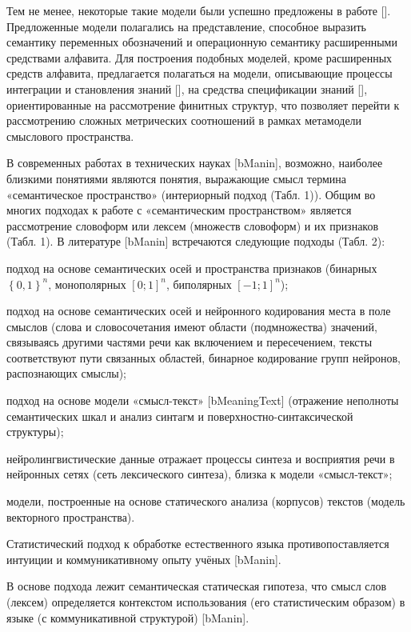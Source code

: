 Тем не менее, некоторые такие модели были успешно предложены в работе []. Предложенные модели полагались на представление, способное выразить семантику переменных обозначений и операционную семантику расширенными средствами алфавита. Для построения подобных моделей, кроме расширенных средств алфавита, предлагается полагаться на модели, описывающие процессы интеграции и становления знаний [], на средства спецификации знаний [], ориентированные на рассмотрение финитных структур, что позволяет перейти к рассмотрению сложных метрических соотношений в рамках метамодели смыслового пространства.

В современных работах в технических науках [bManin], возможно, наиболее близкими понятиями являются понятия, выражающие смысл термина «семантическое пространство» (интериорный подход (Табл. 1)).
Общим во многих подходах к работе с «семантическим пространством» является рассмотрение словоформ или лексем (множеств словоформ) и их признаков (Табл. 1). В литературе [bManin] встречаются следующие подходы (Табл. 2):
\begin{scnitemize}
	\item подход на основе семантических осей и пространства признаков (бинарных $\left\lbrace 0,1\right\rbrace ^{n}$, монополярных $\left[0;1\right]^{n}$, биполярных $\left[-1;1\right]^{n}$);
	\item подход на основе семантических осей и нейронного кодирования места в поле смыслов (слова и словосочетания имеют области (подмножества) значений, связываясь другими частями речи как включением и пересечением, тексты соответствуют пути связанных областей, бинарное кодирование групп нейронов, распознающих смыслы);
	\item подход на основе модели «смысл-текст» [bMeaningText] (отражение неполноты семантических шкал и анализ синтагм и поверхностно-синтаксической структуры);
	\item нейролингвистические данные отражает процессы синтеза и восприятия речи в нейронных сетях (сеть лексического синтеза), близка к модели «смысл‑текст»;
	\item модели, построенные на основе статического анализа (корпусов) текстов (модель векторного пространства).
\end{scnitemize}
Статистический подход к обработке естественного языка противопоставляется интуиции и коммуникативному опыту учёных [bManin].

В основе подхода лежит семантическая статическая гипотеза, что смысл слов (лексем) определяется контекстом использования (его статистическим образом) в языке (с коммуникативной структурой) [bManin].

